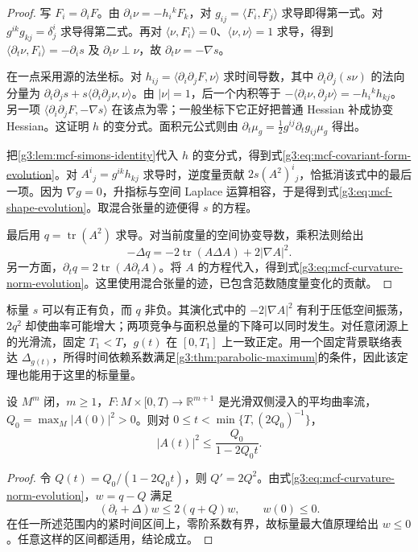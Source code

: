 \begin{proof}
	写 \(F_i=\partial_iF\)。由 \(\partial_i\nu=-h_i{}^kF_k\)，对 \(g_{ij}=\langle F_i,F_j\rangle\) 求导即得第一式。对 \(g^{ik}g_{kj}=\delta^i_j\) 求导得第二式。再对 \(\langle\nu,F_i\rangle=0\)、\(\langle\nu,\nu\rangle=1\) 求导，得到 \(\langle\partial_t\nu,F_i\rangle=-\partial_i s\) 及 \(\partial_t\nu\perp\nu\)，故 \(\partial_t\nu=-\nabla s\)。

	在一点采用源的法坐标。对 \(h_{ij}=\langle\partial_i\partial_jF,\nu\rangle\) 求时间导数，其中 \(\partial_i\partial_j(s\nu)\) 的法向分量为
	\(\partial_i\partial_j s+s\langle\partial_i\partial_j\nu,\nu\rangle\)。由 \(|\nu|=1\)，后一个内积等于 \(-\langle\partial_i\nu,\partial_j\nu\rangle=-h_i{}^k h_{kj}\)。另一项 \(\langle\partial_i\partial_jF,-\nabla s\rangle\) 在该点为零；一般坐标下它正好把普通 Hessian 补成协变 Hessian。这证明 \(h\) 的变分式。面积元公式则由
	\(\partial_t\mu_g=\frac12g^{ij}\partial_tg_{ij}\mu_g\) 得出。

	把\cref{g3:lem:mcf-simons-identity}代入 \(h\) 的变分式，得到式\eqref{g3:eq:mcf-covariant-form-evolution}。对 \(A^i{}_j=g^{ik}h_{kj}\) 求导时，逆度量贡献 \(2s(A^2)^i{}_j\)，恰抵消该式中的最后一项。因为 \(\nabla g=0\)，升指标与空间 Laplace 运算相容，于是得到式\eqref{g3:eq:mcf-shape-evolution}。取混合张量的迹便得 \(s\) 的方程。

	最后用 \(q=\operatorname{tr}(A^2)\) 求导。对当前度量的空间协变导数，乘积法则给出
	\[
		-\Delta q=-2\operatorname{tr}(A\Delta A)+2|\nabla A|^2.
	\]
	另一方面，\(\partial_tq=2\operatorname{tr}(A\partial_tA)\)。将 \(A\) 的方程代入，得到式\eqref{g3:eq:mcf-curvature-norm-evolution}。这里使用混合张量的迹，已包含范数随度量变化的贡献。
\end{proof}

标量 \(s\) 可以有正有负，而 \(q\) 非负。其演化式中的 \(-2|\nabla A|^2\) 有利于压低空间振荡，\(2q^2\) 却使曲率可能增大；两项竞争与面积总量的下降可以同时发生。对任意闭源上的光滑流，固定 \(T_1<T\)，\(g(t)\) 在 \([0,T_1]\) 上一致正定。用一个固定背景联络表达 \(\Delta_{g(t)}\)，所得时间依赖系数满足\cref{g3:thm:parabolic-maximum}的条件，因此该定理也能用于这里的标量量。

\begin{corollary}\label{g3:cor:mcf-curvature-ode-bound}
	设 \(M^m\) 闭，\(m\ge1\)，\(F:M\times[0,T)\to\mathbb R^{m+1}\) 是光滑双侧浸入的平均曲率流，\(Q_0=\max_M|A(0)|^2>0\)。则对 \(0\le t<\min\{T,(2Q_0)^{-1}\}\)，
	\[
		|A(t)|^2\le\frac{Q_0}{1-2Q_0t}.
	\]
\end{corollary}
\begin{proof}
	令 \(Q(t)=Q_0/(1-2Q_0t)\)，则 \(Q'=2Q^2\)。由式\eqref{g3:eq:mcf-curvature-norm-evolution}，\(w=q-Q\) 满足
	\[
		(\partial_t+\Delta)w\le 2(q+Q)w,\qquad w(0)\le0.
	\]
	在任一所述范围内的紧时间区间上，零阶系数有界，故标量最大值原理给出 \(w\le0\)。任意这样的区间都适用，结论成立。
\end{proof}

